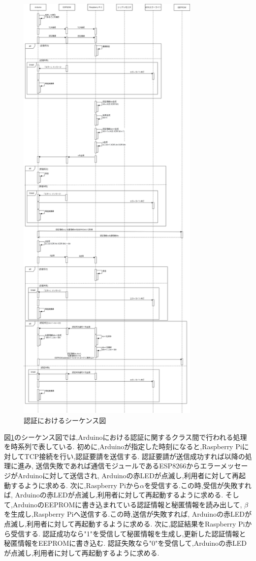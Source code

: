 \begin{figure}[H]
\begin{center}
	\includegraphics[height=220mm]{ninsyo_sequence.png}
	\caption{認証におけるシーケンス図}
	\label{fig:ninsyo_sequence}
\end{center}
\end{figure}

図\ref{fig:ninsyo_sequence}のシーケンス図では,Arduinoにおける認証に関するクラス間で行われる処理を時系列で表している.
初めに,Arduinoが指定した時刻になると,Raspberry Piに対してTCP接続を行い,認証要請を送信する.
認証要請が送信成功すれば以降の処理に進み,
送信失敗であれば通信モジュールであるESP8266からエラーメッセージがArduinoに対して送信され,
Arduinoの赤LEDが点滅し,利用者に対して再起動するように求める.
次に,Raspberry Piから$\alpha$を受信する.この時,受信が失敗すれば,
Arduinoの赤LEDが点滅し,利用者に対して再起動するように求める.
そして,ArduinoのEEPROMに書き込まれている認証情報と秘匿情報を読み出して,
$\beta$を生成し,Raspberry Piへ送信する.この時,送信が失敗すれば,
Arduinoの赤LEDが点滅し,利用者に対して再起動するように求める.
次に,認証結果をRaspberry Piから受信する.
認証成功なら"1"を受信して秘匿情報を生成し,更新した認証情報と秘匿情報をEEPROMに書き込む.
認証失敗なら"0"を受信して,Arduinoの赤LEDが点滅し,利用者に対して再起動するように求める.

